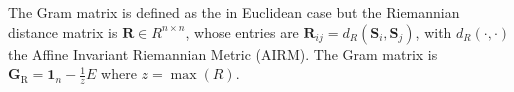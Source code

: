 The Gram matrix is defined as the in Euclidean case but the Riemannian distance matrix is $\boldsymbol{R} \in R^{n\times n}$, whose entries are $\boldsymbol{R}_{ij} = d_R(\boldsymbol{S}_i, \boldsymbol{S}_j)$, with $d_R(\cdot, \cdot)$ the Affine Invariant Riemannian Metric (AIRM).
The Gram matrix is $\boldsymbol{G}_{\mathrm{R}} = \mathbf{1}_n - \frac{1}{z}E$ where $z=\operatorname{max}(R)$.
